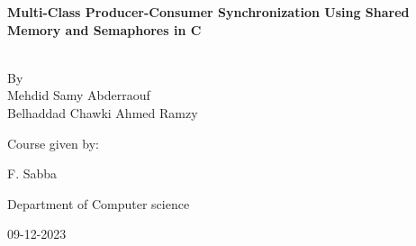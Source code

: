 \documentclass[12pt]{report}
\author{Mehdid Samy Abderraouf \\ 
    Belhaddad Chawki Ahmed Ramzy }
\numberwithin{figure}{chapter}
\begin{document}
\begin{titlepage}
\begin{center}
    \vspace*{-3cm}
    
    \vspace{2.3cm}
    

    \vspace{1cm}
    {\textbf{Multi-Class Producer-Consumer Synchronization Using Shared Memory and Semaphores in C\\}}
    \vspace{3cm}
    
    {}\\
    By\\
    Mehdid Samy Abderraouf \\ 
    Belhaddad Chawki Ahmed Ramzy\\
    \vspace{0.9cm}
    {\begin{singlespace}Course given by:\\\end{singlespace}}
    {\begin{singlespace}F. Sabba\\\end{singlespace}}


\end{center}
{\raggedleft\vfill{\begin{singlespace}
     Department of Computer science\\
\end{singlespace}
 \begin{singlespace}
     09-12-2023
 
 \end{singlespace}
}\par
}
\end{titlepage}
\tableofcontents 
\end{document}
